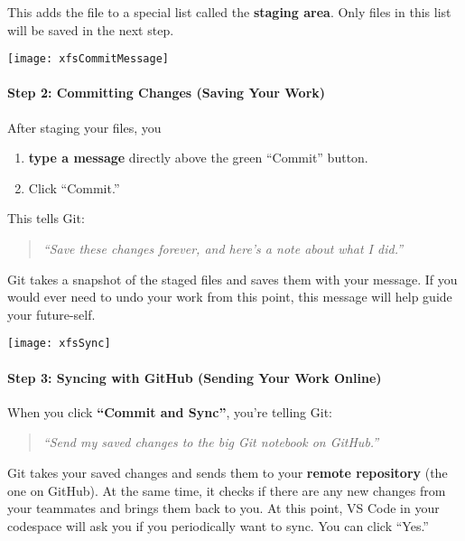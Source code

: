 \documentclass{ximera}
\begin{document}
    This adds the file to a special list called the \textbf{staging area}. Only
    files in this list will be saved in the next step.

\pdfOnly{\end{multicols}}

\newpage

\begin{image}
    \texttt{[image: xfsCommitMessage]}
\end{image}
    \paragraph{Step 2: Committing Changes (Saving Your Work)}

    After staging your files, you
    \begin{enumerate}
        \item \textbf{type a message} directly above the green ``Commit''
              button.
        \item Click ``Commit.''
    \end{enumerate}
    This tells Git:
    \begin{quote}
        \emph{``Save these changes forever, and here's a note about what I
            did.''}
    \end{quote}
    Git takes a snapshot of the staged files and saves them with your message.
    If you would ever need to undo your work from this point, this message will
    help guide your future-self.
\pdfOnly{\end{multicols}}

\newpage

\begin{image}
    \texttt{[image: xfsSync]}
\end{image}
\paragraph{Step 3: Syncing with GitHub (Sending Your Work Online)}
When you click \textbf{``Commit and Sync''}, you're telling Git:
\begin{quote}
    \emph{``Send my saved changes to the big Git notebook on GitHub.''}
\end{quote}
Git takes your saved changes and sends them to your \textbf{remote
    repository}
(the one on GitHub). At the same time, it checks if there are any new
changes from your teammates and brings them back to you. At this point,
VS Code in your codespace will ask you if you periodically want to sync.
You can click ``Yes.''
\pdfOnly{\end{multicols}}
\end{document}
